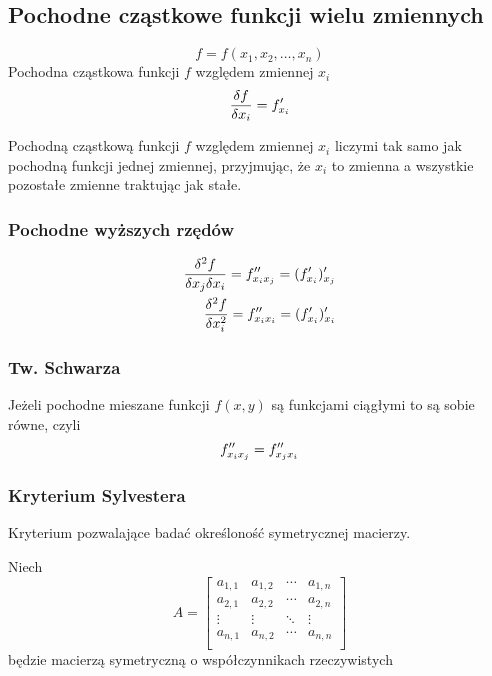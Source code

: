 \documentclass[../Matematyka.tex]{subfiles}
\begin{document}
    \newpage
    \subsection{Pochodne cząstkowe funkcji wielu zmiennych}
    \[f = f(x_1, x_2, \dots, x_n)\]
    Pochodna cząstkowa funkcji \(f\) względem zmiennej \(x_i\)
    \[\frac{\delta f}{\delta x_i} = f^\prime_{x_i}\]

    Pochodną cząstkową funkcji \(f\) względem zmiennej \(x_i\) liczymi tak samo jak pochodną funkcji jednej zmiennej, przyjmując, że \(x_i\) to zmienna a wszystkie pozostałe zmienne traktując jak stałe.

    \subsubsection*{Pochodne wyższych rzędów}
    \begin{align*}
        \frac{\delta^2f}{\delta x_j \delta x_i} = f^{\prime\prime}_{x_i x_j} = (f^\prime_{x_i})^\prime_{x_j} \\
        \frac{\delta^2f}{\delta x^2_i} = f^{\prime\prime}_{x_i x_i} = (f^\prime_{x_i})^\prime_{x_i}
    \end{align*}

    \subsubsection{Tw. Schwarza}
    Jeżeli pochodne mieszane funkcji \(f(x, y)\) są funkcjami ciągłymi to są sobie równe, czyli
    \[f^{\prime\prime}_{x_i x_j} = f^{\prime\prime}_{x_j x_i}\]

    \subsubsection{Kryterium Sylvestera}
    Kryterium pozwalające badać określoność symetrycznej macierzy.

    Niech
    \begin{displaymath}
        A = 
        \begin{bmatrix}
            a_{1,1} & a_{1,2} & \cdots & a_{1,n} \\
            a_{2,1} & a_{2,2} & \cdots & a_{2,n} \\
            \vdots & \vdots & \ddots & \vdots \\
            a_{n,1} & a_{n,2} & \cdots & a_{n,n} \\
        \end{bmatrix}
    \end{displaymath}
    będzie macierzą symetryczną o współczynnikach rzeczywistych
\end{document}

